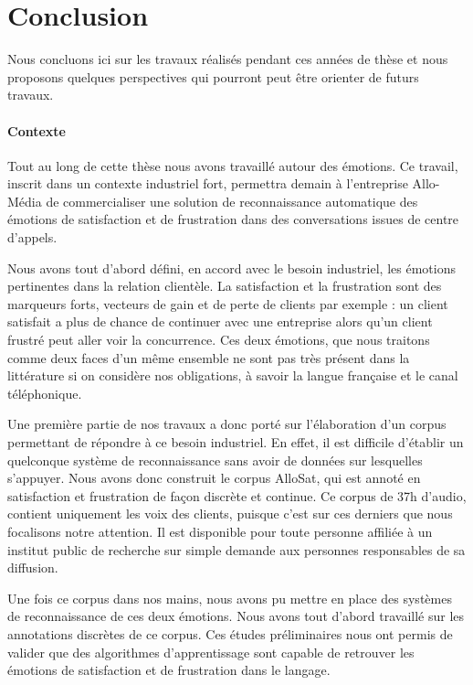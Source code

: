 \chapter*{Conclusion}

Nous concluons ici sur les travaux réalisés pendant ces années de thèse et nous proposons quelques perspectives qui pourront peut être orienter de futurs travaux.

\subsubsection{Contexte}
Tout au long de cette thèse nous avons travaillé autour des émotions. Ce travail, inscrit dans un contexte industriel fort, permettra demain à l'entreprise Allo-Média de commercialiser une solution de reconnaissance automatique des émotions de satisfaction et de frustration dans des conversations issues de centre d'appels.

Nous avons tout d'abord défini, en accord avec le besoin industriel, les émotions pertinentes dans la relation clientèle. La satisfaction et la frustration sont des marqueurs forts, vecteurs de gain et de perte de clients par exemple : un client satisfait a plus de chance de continuer avec une entreprise alors qu'un client frustré peut aller voir la concurrence. Ces deux émotions, que nous traitons comme deux faces d'un même ensemble ne sont pas très présent dans la littérature si on considère nos obligations, à savoir la langue française et le canal téléphonique.

Une première partie de nos travaux a donc porté sur l'élaboration d'un corpus permettant de répondre à ce besoin industriel. En effet, il est difficile d'établir un quelconque système de reconnaissance sans avoir de données sur lesquelles s'appuyer. Nous avons donc construit le corpus AlloSat, qui est annoté en satisfaction et frustration de façon discrète et continue. Ce corpus de 37h d'audio, contient uniquement les voix des clients, puisque c'est sur ces derniers que nous focalisons notre attention. Il est disponible pour toute personne affiliée à un institut public de recherche sur simple demande aux personnes responsables de sa diffusion.

Une fois ce corpus dans nos mains, nous avons pu mettre en place des systèmes de reconnaissance de ces deux émotions. Nous avons tout d'abord travaillé sur les annotations discrètes de ce corpus. Ces études préliminaires nous ont permis de valider que des algorithmes d'apprentissage sont capable de retrouver les émotions de satisfaction et de frustration dans le langage.


